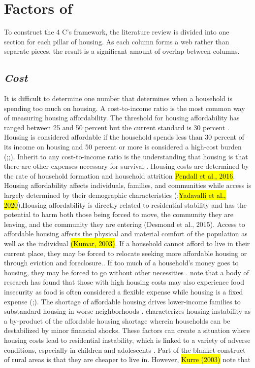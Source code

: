 \chapter{Factors of \hs}	%
To construct the 4 C's framework, the literature review is divided into one section for each pillar of housing. As each column forms a web rather than separate pieces, the result is a significant amount of overlap between columns. 
 
\section{\textit{Cost}}
It is difficult to determine one number that determines when a household is spending too much on housing. A cost-to-income ratio is the most common way of measuring housing affordability. The threshold for housing affordability has ranged between 25 and 50 percent but the current standard is 30 percent \citep{kropczynski_insights_2012}.  Housing is considered affordable if the household spends less than 30 percent of its income on housing and 50 percent or more is considered a high-cost burden (\citealp{braveman_housing_2011};\citealp{swope_housing_2020};\citealp{weicher_housing_2006}). Inherit to any cost-to-income ratio is the understanding that housing is that there are other expenses necessary for survival \citep{herbert_measuring_2018}. Housing costs are determined by the rate of household formation and household attrition \hl{Pendall et al., 2016}.  Housing affordability affects individuals, families, and communities while access is largely determined by their demographic characteristics  (\citealp{braveman_housing_2011};\hl{Yadavalli et al., 2020}).Housing affordability is directly related to residential stability and has the potential to harm both those being forced to move, the community they are leaving, and the community they are entering (Desmond et al., 2015). Access to affordable housing affects the physical and material comfort of the population as well as the individual \hl{(Kumar, 2003)}. If a household cannot afford to live in their current place, they may be forced to relocate seeking more affordable housing or through eviction and foreclosure..  If too much of a household’s money goes to housing, they may be forced to go without other necessities \citep{herbert_measuring_2018}.   note that a body of research has found that those with high housing costs may also experience food insecurity as food is often considered a flexible expense while housing is a fixed expense (\citealp{fletcher_assessing_2009};\citealp{kropczynski_insights_2012}). The shortage of affordable housing drives lower-income families to substandard housing in worse neighborhoods \citep{braveman_housing_2011}. \citet{kang_severe_2021} characterizes housing instability as a by-product of the affordable housing shortage wherein households can be destabilized by minor financial shocks. These  factors can create a situation where housing costs lead to residential instability, which is linked to a variety of adverse conditions, especially in children and adolescents \citep{desmond_forced_2015}. Part of the blanket construct of rural areas is that they are cheaper to live in. However, \hl{Kurre (2003)} note that 
